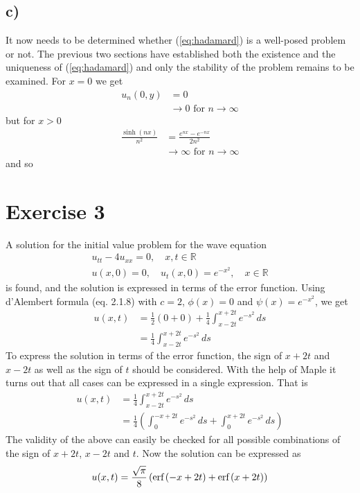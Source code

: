 \documentclass[11pt]{article}
\newcommand\myreal{\mathbb{R}}
\newcommand\erf{\text{erf\,}}
\begin{document}
\subsection*{c)}
It now needs to be determined whether (\ref{eq:hadamard}) is a well-posed problem or not. The previous two sections have established both the existence and the uniqueness of (\ref{eq:hadamard}) and only the stability of the problem remains to be examined. For $x=0$ we get
\begin{align*}
    u_n(0,y) &= 0 \\
    &\to 0 \text{ for } n\to\infty
\end{align*}
but for $x>0$
\begin{align*}
    \frac{\sinh(nx)}{n^2} &= \frac{e^{nx} - e^{-nx}}{2n^2} \\
    &\to \infty \text{ for } n\to\infty
\end{align*}
and so 


\section*{Exercise 3}
A solution for the initial value problem for the wave equation
\begin{gather*}
    u_{tt} - 4u_{xx} = 0,\quad x,t\in\myreal \\
    u(x, 0) = 0,\quad u_t(x, 0)=e^{-x^2}, \quad x\in\myreal
\end{gather*}
is found, and the solution is expressed in terms of the error function. Using d'Alembert formula (eq. 2.1.8) with $c=2$, $\phi(x)=0$ and $\psi(x)=e^{-x^2}$, we get
\begin{align*}
    u(x, t) &= \frac{1}{2}(0+0)+\frac{1}{4}\int_{x-2t}^{x+2t}e^{-s^2}\,ds \\
    &= \frac{1}{4}\int_{x-2t}^{x+2t}e^{-s^2}\,ds
\end{align*}
To express the solution in terms of the error function, the sign of $x+2t$ and $x-2t$ as well as the sign of $t$ should be considered. With the help of Maple it turns out that all cases can be expressed in a single expression. That is
\begin{align*}
    u(x, t) &= \frac{1}{4}\int_{x-2t}^{x+2t}e^{-s^2}\,ds \\
    &= \frac{1}{4}\left(\int_{0}^{-x+2t}e^{-s^2}\,ds + \int_{0}^{x+2t}e^{-s^2}\,ds\right)
\end{align*}
The validity of the above can easily be checked for all possible combinations of the sign of $x+2t$, $x-2t$ and $t$. Now the solution can be expressed as
\begin{align*}
    u(x, t) = \frac{\sqrt{\pi}}{8}\left(\erf(-x+2t) + \erf(x+2t)\right)
\end{align*}
\end{document}
